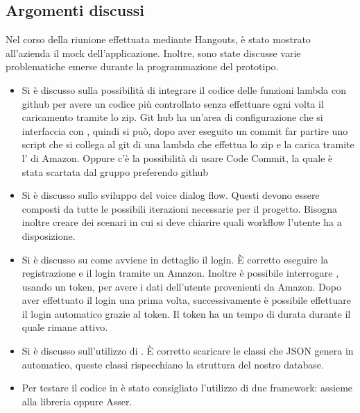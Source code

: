 \documentclass[a4paper,12pt]{article}
\begin{document}
	\subsection{Argomenti discussi}
	Nel corso della riunione effettuata mediante Hangouts, è stato mostrato all'azienda il mock dell'applicazione.  
	Inoltre, sono state discusse varie problematiche emerse durante la programmazione del prototipo.
	\begin{itemize}
		\item {Si è discusso sulla possibilità di integrare il codice delle funzioni lambda con github per avere un codice più controllato senza effettuare ogni volta il caricamento tramite lo zip. Git hub ha  un'area di configurazione che si interfaccia con , quindi si può, dopo aver eseguito un commit far partire uno script che si collega al git di una lambda che effettua lo zip e la carica tramite l' di Amazon. Oppure c'è la possibilità di usare Code Commit, la quale è stata scartata dal gruppo preferendo github}
		\item {Si è discusso sullo sviluppo del voice dialog flow. Questi devono essere composti da tutte le possibili iterazioni necessarie per il progetto. Bisogna inoltre creare dei scenari in cui si deve chiarire quali workflow l'utente ha a disposizione.}
		\item {Si è discusso su come avviene in dettaglio il login. \`{E} corretto eseguire la registrazione e il login tramite un  Amazon. Inoltre è possibile interrogare , usando un token, per avere i dati dell'utente provenienti da Amazon. Dopo aver effettuato il login una prima volta, successivamente è possibile effettuare il login automatico grazie al token. Il token ha un tempo di durata durante il quale rimane attivo.}
		\item {Si è discusso sull'utilizzo di . \`{E} corretto scaricare le classi che JSON genera in automatico, queste classi rispecchiano la struttura del nostro database.}
		\item {Per testare il codice in  è stato consigliato l'utilizzo di due framework:  assieme alla libreria  oppure Asser.}
	\end{itemize}
\end{document}
